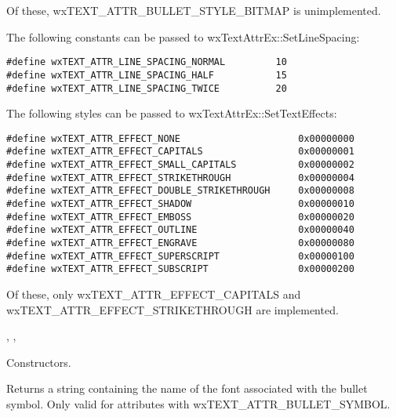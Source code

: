Of these, wxTEXT\_ATTR\_BULLET\_STYLE\_BITMAP is unimplemented.

The following constants can be passed to wxTextAttrEx::SetLineSpacing:

{\small
\begin{verbatim}
#define wxTEXT_ATTR_LINE_SPACING_NORMAL         10
#define wxTEXT_ATTR_LINE_SPACING_HALF           15
#define wxTEXT_ATTR_LINE_SPACING_TWICE          20
\end{verbatim}
}

The following styles can be passed to wxTextAttrEx::SetTextEffects:

{\small
\begin{verbatim}
#define wxTEXT_ATTR_EFFECT_NONE                     0x00000000
#define wxTEXT_ATTR_EFFECT_CAPITALS                 0x00000001
#define wxTEXT_ATTR_EFFECT_SMALL_CAPITALS           0x00000002
#define wxTEXT_ATTR_EFFECT_STRIKETHROUGH            0x00000004
#define wxTEXT_ATTR_EFFECT_DOUBLE_STRIKETHROUGH     0x00000008
#define wxTEXT_ATTR_EFFECT_SHADOW                   0x00000010
#define wxTEXT_ATTR_EFFECT_EMBOSS                   0x00000020
#define wxTEXT_ATTR_EFFECT_OUTLINE                  0x00000040
#define wxTEXT_ATTR_EFFECT_ENGRAVE                  0x00000080
#define wxTEXT_ATTR_EFFECT_SUPERSCRIPT              0x00000100
#define wxTEXT_ATTR_EFFECT_SUBSCRIPT                0x00000200
\end{verbatim}
}

Of these, only wxTEXT\_ATTR\_EFFECT\_CAPITALS and wxTEXT\_ATTR\_EFFECT\_STRIKETHROUGH are implemented.


, , 



\label{wxtextattrexwxtextattrex}




Constructors.

\label{wxtextattrexgetbulletfont}


Returns a string containing the name of the font associated with the bullet symbol.
Only valid for attributes with wxTEXT\_ATTR\_BULLET\_SYMBOL.

